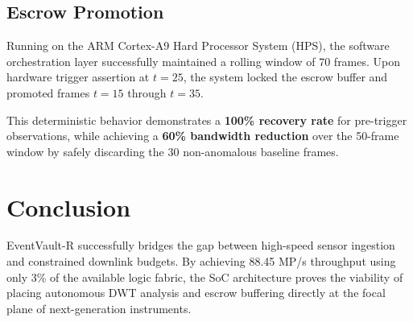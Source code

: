 \documentclass[journal]{IEEEtran}
\begin{document}
\subsection{Escrow Promotion}
Running on the ARM Cortex-A9 Hard Processor System (HPS), the software orchestration layer successfully maintained a rolling window of 70 frames. Upon hardware trigger assertion at $t=25$, the system locked the escrow buffer and promoted frames $t=15$ through $t=35$. 

This deterministic behavior demonstrates a \textbf{100\% recovery rate} for pre-trigger observations, while achieving a \textbf{60\% bandwidth reduction} over the 50-frame window by safely discarding the 30 non-anomalous baseline frames.

\section{Conclusion}
EventVault-R successfully bridges the gap between high-speed sensor ingestion and constrained downlink budgets. By achieving 88.45 MP/s throughput using only 3\% of the available logic fabric, the SoC architecture proves the viability of placing autonomous DWT analysis and escrow buffering directly at the focal plane of next-generation instruments.
\end{document}

